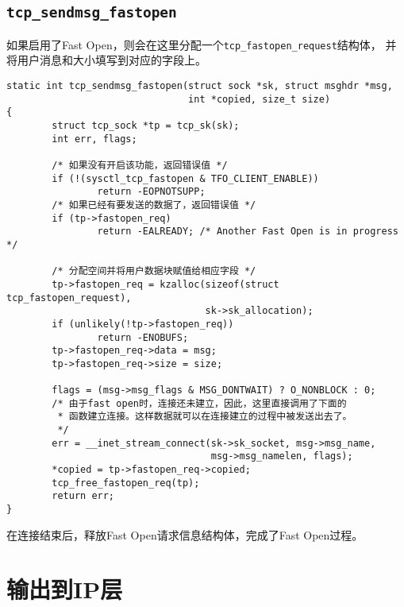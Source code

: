 \subsection{\texttt{tcp_sendmsg_fastopen}}
如果启用了Fast Open，则会在这里分配一个\texttt{tcp_fastopen_request}结构体，
并将用户消息和大小填写到对应的字段上。
\begin{verbatim}
static int tcp_sendmsg_fastopen(struct sock *sk, struct msghdr *msg,
                                int *copied, size_t size)
{
        struct tcp_sock *tp = tcp_sk(sk);
        int err, flags;

        /* 如果没有开启该功能，返回错误值 */
        if (!(sysctl_tcp_fastopen & TFO_CLIENT_ENABLE))
                return -EOPNOTSUPP;
        /* 如果已经有要发送的数据了，返回错误值 */
        if (tp->fastopen_req)
                return -EALREADY; /* Another Fast Open is in progress */

        /* 分配空间并将用户数据块赋值给相应字段 */
        tp->fastopen_req = kzalloc(sizeof(struct tcp_fastopen_request),
                                   sk->sk_allocation);
        if (unlikely(!tp->fastopen_req))
                return -ENOBUFS;
        tp->fastopen_req->data = msg;
        tp->fastopen_req->size = size;

        flags = (msg->msg_flags & MSG_DONTWAIT) ? O_NONBLOCK : 0;
        /* 由于fast open时，连接还未建立，因此，这里直接调用了下面的
         * 函数建立连接。这样数据就可以在连接建立的过程中被发送出去了。
         */
        err = __inet_stream_connect(sk->sk_socket, msg->msg_name,
                                    msg->msg_namelen, flags);
        *copied = tp->fastopen_req->copied;
        tcp_free_fastopen_req(tp);
        return err;
}
\end{verbatim}
在连接结束后，释放Fast Open请求信息结构体，完成了Fast Open过程。

\section{输出到IP层}
